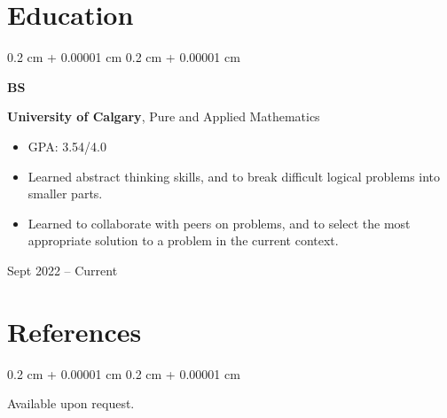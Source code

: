 \documentclass[10pt, letterpaper]{article}
\newenvironment{highlights}{
    \begin{itemize}[
        topsep=0.10 cm,
        parsep=0.10 cm,
        partopsep=0pt,
        itemsep=0pt,
        leftmargin=0.4 cm + 10pt
    ]
}{
    \end{itemize}
} %
\newenvironment{onecolentry}{
    \begin{adjustwidth}{
        0.2 cm + 0.00001 cm
    }{
        0.2 cm + 0.00001 cm
    }
}{
    \end{adjustwidth}
} %
\newenvironment{threecolentry}[3][]{
    \onecolentry
    \def\thirdColumn{#3}
    \setcolumnwidth{1 cm, \fill, 4.5 cm}
    \begin{paracol}{3}
    {\raggedright #2} \switchcolumn
}{
    \switchcolumn \raggedleft \thirdColumn
    \end{paracol}
    \endonecolentry
} %
\begin{document}
    \section{Education}

        \begin{threecolentry}{\textbf{BS}}{
            Sept 2022 – Current
        }
            \textbf{University of Calgary}, Pure and Applied Mathematics
            \begin{highlights}
                \item GPA: 3.54/4.0 
                \item Learned abstract thinking skills, and to break difficult logical problems into smaller parts.
                \item Learned to collaborate with peers on problems, and to select the most appropriate solution to a problem in the current context.
            \end{highlights}
        \end{threecolentry}

    \section{References}
        \begin{onecolentry}
            \begin{highlights}
                Available upon request.
            \end{highlights}
        \end{onecolentry}
\end{document}
